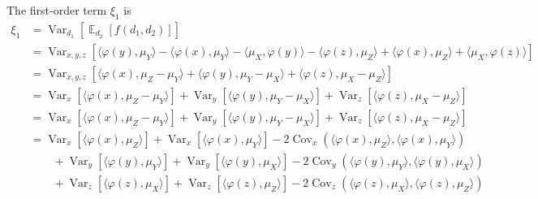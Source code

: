 \documentclass{article}
\DeclareMathOperator{\E}{\mathbb{E}}
\DeclareMathOperator{\Var}{Var}
\DeclareMathOperator{\Cov}{Cov}
\begin{document}
The first-order term $\xi_1$ is
\begin{align*}
     \xi_1
  &= \Var_{d_1}\left[ \E_{d_2}\left[ f(d_1, d_2 )\right] \right]
\\&= \Var_{x, y, z}\left[
          \langle \varphi(y), \mu_Y \rangle
        - \langle \varphi(x), \mu_Y \rangle
        - \langle \mu_X, \varphi(y) \rangle
        - \langle \varphi(z), \mu_Z \rangle
        + \langle \varphi(x), \mu_Z \rangle
        + \langle \mu_X, \varphi(z) \rangle
     \right]
\\&= \Var_{x, y, z}\left[
          \langle \varphi(x), \mu_Z - \mu_Y \rangle
        + \langle \varphi(y), \mu_Y - \mu_X \rangle
        + \langle \varphi(z), \mu_X - \mu_Z \rangle
     \right]
\\&= \Var_{x}\left[ \langle \varphi(x), \mu_Z - \mu_Y \rangle \right]
   + \Var_{y}\left[ \langle \varphi(y), \mu_Y - \mu_X \rangle \right]
   + \Var_{z}\left[ \langle \varphi(z), \mu_X - \mu_Z \rangle \right]
\\&= \Var_{x}\left[ \langle \varphi(x), \mu_Z - \mu_Y \rangle \right]
   + \Var_{y}\left[ \langle \varphi(y), \mu_Y - \mu_X \rangle \right]
   + \Var_{z}\left[ \langle \varphi(z), \mu_X - \mu_Z \rangle \right]
\\&= \Var_{x}\left[ \langle \varphi(x), \mu_Z  \rangle \right]
   + \Var_{x}\left[ \langle \varphi(x), \mu_Y \rangle \right]
   - 2 \Cov_x\left( \langle \varphi(x), \mu_Z \rangle, \langle \varphi(x), \mu_Y \rangle \right)
\\&\qquad
   + \Var_{y}\left[ \langle \varphi(y), \mu_Y  \rangle \right]
   + \Var_{y}\left[ \langle \varphi(y), \mu_X \rangle \right]
   - 2 \Cov_y\left( \langle \varphi(y), \mu_Y \rangle, \langle \varphi(y), \mu_X \rangle \right)
\\&\qquad
   + \Var_{z}\left[ \langle \varphi(z), \mu_X  \rangle \right]
   + \Var_{z}\left[ \langle \varphi(z), \mu_Z \rangle \right]
   - 2 \Cov_z\left( \langle \varphi(z), \mu_X \rangle, \langle \varphi(z), \mu_Z \rangle \right)

\end{align*}
\end{document}

